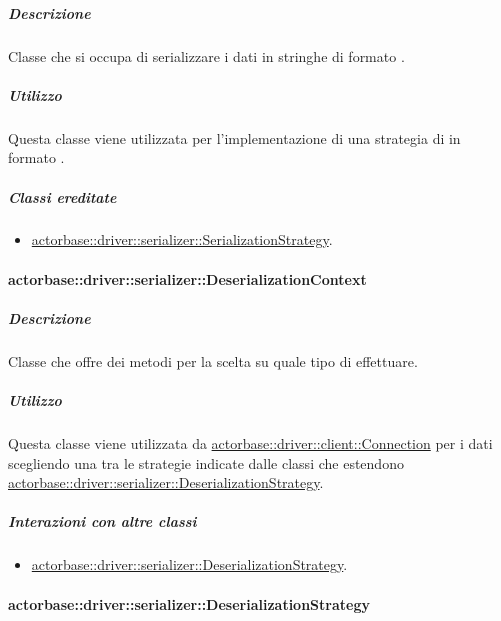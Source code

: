 \documentclass{scalatekids-article}
\begin{document}
\subparagraph{Descrizione}

Classe che si occupa di serializzare i dati in stringhe di formato .

\subparagraph{Utilizzo}

Questa classe viene utilizzata per l'implementazione di una strategia di
 in formato .

\subparagraph{Classi ereditate}

\begin{itemize}

\item \hyperref[sec:actorbase::driver::serializer::SerializationStrategy]{actorbase::driver::serializer::SerializationStrategy}.

\end{itemize}

\paragraph{actorbase::driver::serializer::DeserializationContext}
\label{sec:actorbase::driver::serializer::DeserializationContext}

\subparagraph{Descrizione}

Classe che offre dei metodi per la scelta su quale tipo di 
effettuare.

\subparagraph{Utilizzo}

Questa classe viene utilizzata da \hyperref[sec:actorbase::driver::client::Connection]{actorbase::driver::client::Connection}
per  i dati scegliendo una tra le strategie indicate
dalle classi che estendono \hyperref[sec:actorbase::driver::serializer::DeserializationStrategy]{actorbase::driver::serializer::DeserializationStrategy}.

\subparagraph{Interazioni con altre classi}

\begin{itemize}

\item \hyperref[sec:actorbase::driver::serializer::DeserializationStrategy]{actorbase::driver::serializer::DeserializationStrategy}.

\end{itemize}

\paragraph{actorbase::driver::serializer::DeserializationStrategy}
\label{sec:actorbase::driver::serializer::DeserializationStrategy}
\end{document}
